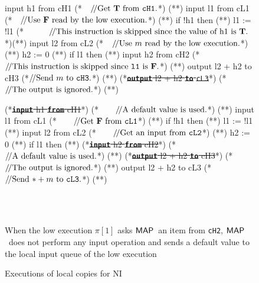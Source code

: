 \documentclass[10pt,a4paper,oneside]{article}
\def\VTRUE{\ensuremath{\textbf{T}}}
\def\VFALSE{\ensuremath{\textbf{F}}}
\def\sanserif#1{\ensuremath{\sf #1}}
\def\MAP{\ensuremath{\sanserif{MAP}}}
\def\Prog{\ensuremath{\pi}}
\def\Progl#1{\ensuremath{\Prog[#1]}}
\def\ctab{}
\def\icomment#1{\ensuremath{\ctab/\!/\textnormal{#1}}}
\def\figdesc#1{
\noindent
\centering
\begin{minipage}{0.95\columnwidth}
\vspace{3pt}
\begin{footnotesize}
#1
\end{footnotesize}
\end{minipage}
}
\def\linecode#1{{\texttt{#1}}}
\def\linecodeb#1{{\texttt{\bfseries #1}}}
\begin{document}
\begin{figure}[!t]
\begin{lrbox}{\mylistingbox}\begin{minipage}{\columnwidth}\begin{javascript}
input h1 from cH1 (*~~\icomment{Get \VTRUE\ from \linecode{cH1}.}*) (*\label{example:NI:HEx:l1}*)
input l1 from cL1 (*~~\icomment{Use \VFALSE\ read by the low execution.}*) (*\label{example:NI:HEx:l2}*)
if !h1 then       (*\label{example:NI:HEx:l3}*)
    l1 := !l1     (*~~~~~~\icomment{This instruction is skipped since the value of h1 is \VTRUE.}*)(*\label{example:NI:HEx:l4}*)
input l2 from cL2 (*~~\icomment{Use $m$ read by the low execution.}*) (*\label{example:NI:HEx:l5}*)
h2 := 0           (*\label{example:NI:HEx:l6}*)
if l1 then        (*\label{example:NI:HEx:l7}*)
    input h2 from cH2 (*\icomment{This instruction is skipped since \linecode{l1} is \VFALSE.}*)   (*\label{example:NI:HEx:l8}*)
output l2 + h2 to cH3 (*\icomment{Send $m$ to \linecode{cH3}.}*)  (*\label{example:NI:HEx:l9}*)
(*\sout{\linecodeb{output} l2 + h2 \linecodeb{to} \linecode{cL3}}*)  (*\icomment{The output is ignored.}*) (*\label{example:NI:HEx:l10}*)
\end{javascript}\end{minipage}\end{lrbox} \subfloat[The high execution \Progl{0}]{\label{fig:example:NI:execution:H}\usebox{\mylistingbox}}\begin{lrbox}{\mylistingbox}\begin{minipage}{\columnwidth}\begin{javascript}
(*\sout{\linecodeb{input} h1 \linecodeb{from} cH1}*) (*~~~~\icomment{A default value is used.}*) (*\label{example:NI:LEx:l1}*)
input l1 from cL1 (*~~~~\icomment{Get \VFALSE\ from \linecode{cL1}}*) (*\label{example:NI:LEx:l2}*)
if !h1 then (*\label{example:NI:LEx:l3}*)
    l1 := !l1 (*\label{example:NI:LEx:l4}*)
input l2 from cL2 (*~~~~\icomment{Get an input from \linecode{cL2}}*) (*\label{example:NI:LEx:l5}*)
h2 := 0 (*\label{example:NI:LEx:l6}*)
if l1 then  (*\label{example:NI:LEx:l7}*)
    (*\sout{\linecodeb{input} h2 \linecodeb{from} cH2}*) (*\icomment{A default value is used.}*) (*\label{example:NI:LEx:l8}*)
(*\sout{\linecodeb{output} l2 + h2 \linecodeb{to} cH3}*) (*\icomment{The output is ignored.}*) (*\label{example:NI:LEx:l9}*)
output l2 + h2 to cL3 (*\icomment{Send $*+m$ to \linecode{cL3}.}*)  (*\label{example:NI:LEx:l10}*)
\end{javascript}\end{minipage}\end{lrbox} \\
\subfloat[The low execution \Progl{1}]{\label{fig:example:NI:execution:L}\usebox{\mylistingbox}}\\
\figdesc{When the low execution \Progl{1} asks \MAP\ an item from \linecode{cH2}, \MAP\ does not perform any input operation and sends a default value to the local input queue of the low execution}
\caption{Executions of local copies for NI}
\label{fig:example:execution:NI:HLUEx}
\end{figure}
\end{document}
